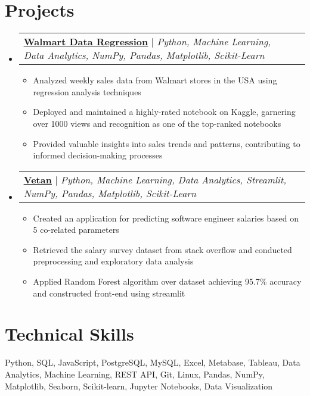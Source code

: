 \documentclass[letterpaper,11pt]{article}
\makeatletter
\newcommand{\resumeItem}[1]{
  \item\small{
    {#1 \vspace{-2pt}}
  }
}
\newcommand{\resumeProjectHeading}[2]{
    \item
    \begin{tabular*}{1.001\textwidth}{l@{\extracolsep{\fill}}r}
      \small#1 & \textbf{\small #2}\\
    \end{tabular*}\vspace{-7pt}
}
\newcommand{\resumeSubHeadingListStart}{\begin{itemize}[leftmargin=0.0in, label={}]}
\newcommand{\resumeSubHeadingListEnd}{\end{itemize}}
\newcommand{\resumeItemListStart}{\begin{itemize}}
\newcommand{\resumeItemListEnd}{\end{itemize}\vspace{-5pt}}
\makeatother
\begin{document}
\section{Projects}
    \vspace{-5pt}
    \resumeSubHeadingListStart
    \resumeProjectHeading
      {\textbf{\href{https://www.kaggle.com/code/shauryasarswat/walmart-data-regression}{\underline{Walmart Data Regression}}} $|$ \emph{Python, Machine Learning, Data Analytics, NumPy, Pandas, Matplotlib, Scikit-Learn}}{}
        \vspace{-10pt}
          \resumeItemListStart
            \resumeItem{Analyzed weekly sales data from Walmart stores in the USA using regression analysis techniques}
            \resumeItem{Deployed and maintained a highly-rated notebook on Kaggle, garnering over 1000 views and recognition as one of the top-ranked notebooks}
            \resumeItem{Provided valuable insights into sales trends and patterns, contributing to informed decision-making processes}
          \resumeItemListEnd
          \vspace{-13pt}
      \resumeProjectHeading
      {\textbf{\href{https://github.com/ShauryaSarswat/Vetan}{\underline{Vetan}}}  $|$ \emph{Python, Machine Learning, Data Analytics, Streamlit, NumPy, Pandas, Matplotlib, Scikit-Learn}}{}
        \vspace{-13pt}
          \resumeItemListStart
            \resumeItem{Created an application for predicting software engineer salaries based on 5 co-related parameters}
            \resumeItem{Retrieved the salary survey dataset from stack overflow and conducted preprocessing and exploratory data analysis}
            \resumeItem{Applied Random Forest algorithm over dataset achieving 95.7\% accuracy and constructed front-end using streamlit}
          \resumeItemListEnd
          \vspace{-1pt}
    \resumeSubHeadingListEnd
\vspace{-12pt}
\section{Technical Skills}
 \begin{itemize}[leftmargin=0.15in, label={}]
    \small{\item{
     Python, SQL, JavaScript, PostgreSQL, MySQL, Excel, Metabase, Tableau, Data Analytics, Machine Learning, REST API, Git, Linux, Pandas, NumPy, Matplotlib, Seaborn, Scikit-learn, Jupyter Notebooks, Data Visualization
    }}
 \end{itemize}
 \vspace{-18pt}
\end{document}
